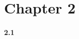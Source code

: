 \documentclass[a4paper,12pt]{article}\usepackage[]{graphicx}\usepackage[]{color}
\theoremstyle{mytheor}
\begin{document}
\section{Chapter 2}
\paragraph{2.1}
\end{document}
